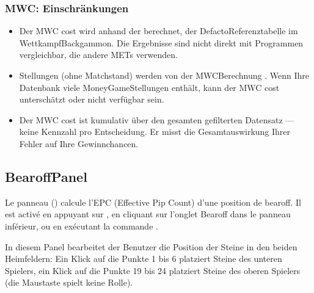 \documentclass[letterpaper,10pt,german]{sphinxmanual}
\begin{document}
\subsubsection{MWC: Einschränkungen}
\label{\detokenize{manuel:mwc-limitations}}\begin{itemize}
\item {} 
\sphinxAtStartPar
Der MWC cost wird anhand der  berechnet, der De\sphinxhyphen{}facto\sphinxhyphen{}Referenztabelle im Wettkampf\sphinxhyphen{}Backgammon. Die Ergebnisse sind nicht direkt mit Programmen vergleichbar, die andere METs verwenden.

\item {} 
\sphinxAtStartPar
{}\sphinxhyphen{}Stellungen (ohne Matchstand) werden von der MWC\sphinxhyphen{}Berechnung . Wenn Ihre Datenbank viele Money\sphinxhyphen{}Game\sphinxhyphen{}Stellungen enthält, kann der MWC cost unterschätzt oder nicht verfügbar sein.

\item {} 
\sphinxAtStartPar
Der MWC cost ist kumulativ über den gesamten gefilterten Datensatz — keine Kennzahl pro Entscheidung. Er misst die Gesamtauswirkung Ihrer Fehler auf Ihre Gewinnchancen.

\end{itemize}


\subsection{Bearoff\sphinxhyphen{}Panel}
\label{\detokenize{manuel:panneau-bearoff}}\label{\detokenize{manuel:panneau-epc}}
\sphinxAtStartPar
Le panneau  () calcule l’EPC (Effective Pip Count) d’une
position de bearoff. Il est activé en appuyant sur , en cliquant sur
l’onglet Bearoff dans le panneau inférieur, ou en exécutant la commande
.

\sphinxAtStartPar
In diesem Panel bearbeitet der Benutzer die Position der Steine in den beiden Heimfeldern: Ein Klick auf die Punkte 1 bis 6 platziert Steine des unteren Spielers, ein Klick auf die Punkte 19 bis 24 platziert Steine des oberen Spielers (die Maustaste spielt keine Rolle).
\end{document}

